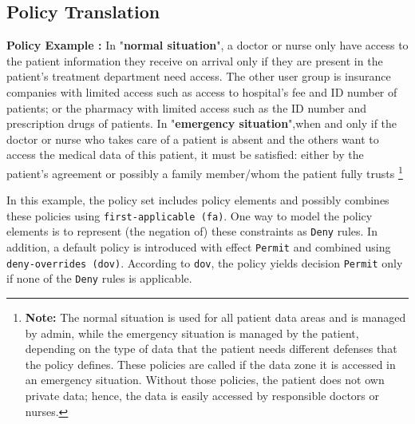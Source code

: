 \subsection{Policy Translation}\label{Back:policy-translation}

\textbf{Policy Example :} In "\textbf{normal situation}", a doctor or nurse only have access to the patient information they receive on arrival only if they are present in the patient's treatment department need access. 
The other user group is insurance companies with limited access such as access to hospital's fee and ID number of patients; or the pharmacy with limited access such as the ID number and prescription drugs of patients.
In "\textbf{emergency situation}",when and only if the doctor or nurse who takes care of a patient is absent and the others want to access the medical data of this patient, it must be satisfied: either by the patient's agreement or possibly a family member/whom the patient fully trusts%
\footnote{\textbf{Note: }The normal situation is used for all patient data areas and is managed by admin, while the emergency situation is managed by the patient, depending on the type of data that the patient needs different defenses that the policy defines. 
These policies are called if the data zone it is accessed in an emergency situation.
Without those policies, the patient does not own private data; hence, the data is easily accessed by responsible doctors or nurses.} 

In this example, the policy set includes policy elements and possibly combines these policies using \texttt{first-applicable (fa)}. One way to model the policy elements is to represent (the negation of) these constraints as  \texttt{Deny} rules. 
In addition, a default policy is introduced with effect \texttt{Permit} and combined using \texttt{deny-overrides (dov)}. 
According to  \texttt{dov}, the policy yields decision  \texttt{Permit} only if none of the \texttt{Deny} rules is applicable. 

